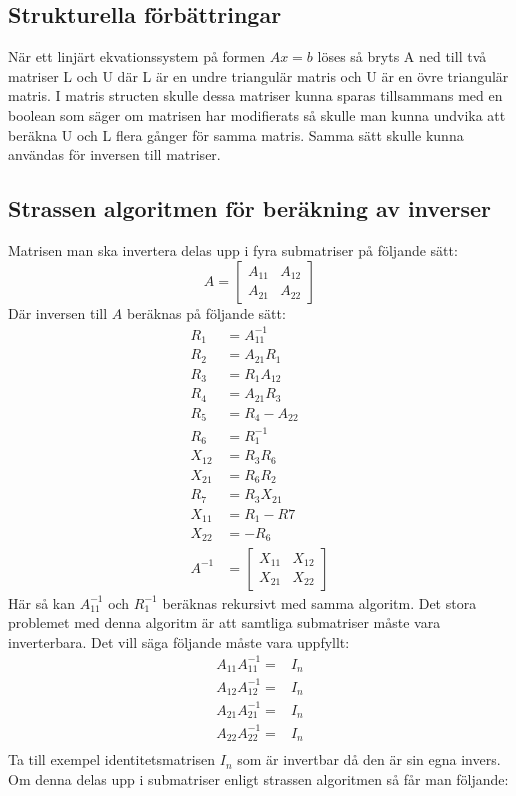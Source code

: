 \subsection{Strukturella förbättringar}
När ett linjärt ekvationssystem på formen $Ax=b $ löses så bryts A ned till två matriser L och U där L är en undre triangulär matris och U är en övre triangulär matris. I matris structen skulle dessa matriser kunna sparas tillsammans med en boolean som säger om matrisen har modifierats så skulle man kunna undvika att beräkna U och L flera gånger för samma matris. Samma sätt skulle kunna användas för inversen till matriser. 

\subsection{Strassen algoritmen för beräkning av inverser}
\label{sec:inverse_nackdelar}
Matrisen man ska invertera delas upp i fyra submatriser på följande sätt:
$$A=\begin{bmatrix}
A_{11} & A_{12} \\
A_{21}& A_{22}
 \end{bmatrix}
 $$
 Där inversen till $A$ beräknas på följande sätt\cite{Petkovic2013}:
 \begin{align}
  R_1 & =A_{11}^{-1} \\
  R_2 & =A_{21}R_1 \\
  R_3 & =R_1A_{12} \\
  R_4 & =A_{21}R_3 \\
  R_5 & =R_4 -A_{22} \\
  R_6 & =R_1^{-1} \\
  X_{12} & =R_3R_6 \\
  X_{21} & =R_6R_2 \\
  R_7 & =R_3X_{21} \\
  X_{11} & =R_1 -R7 \\
  X_{22} & =-R_6 \\
 A^{-1} & =\begin{bmatrix}
X_{11} & X_{12} \\
X_{21}& X_{22}
 \end{bmatrix}
 \end{align}
 Här så kan $A_{11}^{-1}$ och $R_1^{-1}$ beräknas rekursivt med samma algoritm. Det stora problemet med denna algoritm är att samtliga submatriser måste vara inverterbara. Det vill säga följande måste vara uppfyllt:
 \begin{align}
   A_{11}A_{11}^{-1}= & I_n \\
   A_{12}A_{12}^{-1}= & I_n \\
   A_{21}A_{21}^{-1}= & I_n \\
   A_{22}A_{22}^{-1}= & I_n \\
 \end{align}
 Ta till exempel identitetsmatrisen $I_n$ som är invertbar då den är sin egna invers. Om denna delas upp i submatriser enligt strassen algoritmen så får man följande:
 
